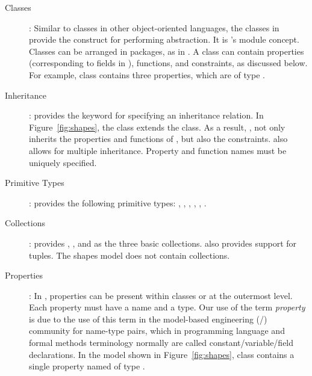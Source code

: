 \begin{description}

\item [Classes]: Similar to classes in other object-oriented 
  languages, the classes in
  \Klang{} provide the construct for performing abstraction. It is \Klang{}'s
   module concept. Classes can be arranged in packages, as in \java.
   A class can contain properties (corresponding to fields in \java), functions, 
   and constraints, as discussed below. For example, class  
   contains three properties, which are of type .

\item [Inheritance]: \Klang{} provides the  keyword for
  specifying an inheritance relation. In Figure~\ref{fig:shapes},
  the  class extends the  class. As a result,
  , not only inherits the properties and functions of
  , but also the constraints. \Klang{} also allows for
  multiple inheritance. Property and function names must be uniquely
  specified.

\item [Primitive Types]: \Klang{} provides the following primitive
  types: , , , ,
  , .

\item [Collections]: \Klang{} provides , , and
   as the three basic collections. \Klang{} also provides
  support for tuples. The shapes model
  does not contain collections.

\item [Properties]: In \Klang{}, properties can be present within
  classes or at the outermost level. Each property must have a name
  and a type. Our use of the term {\em property} is due to the use of this term
  in the model-based engineering (\uml/\sysml) community for name-type pairs,
  which in programming language and formal methods terminology normally are called
  constant/variable/field declarations.
  In the model shown in Figure~\ref{fig:shapes}, class
   contains a single property named  of type
  .


\end{description}
